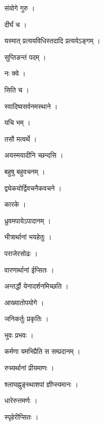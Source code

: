 \documentclass[10pt, openany]{book}
\begin{document}
\noindent संयोगे गुरु ।

\noindent दीर्घं च ।

\noindent यस्मात् प्रत्ययविधिस्तदादि प्रत्ययेऽङ्गम् ।

\noindent सुप्तिङन्तं पदम् ।

\noindent नः क्ये ।

\noindent सिति च ।

\noindent स्वादिष्वसर्वनमस्थाने ।

\noindent यचि भम् ।

\noindent तसौ मत्वर्थे ।

\noindent अयस्मयादीनि च्छन्दसि ।

\noindent बहुषु बहुवचनम् ।

\noindent द्व्येकयोर्द्विवचनैकवचने ।

\noindent कारके ।

\noindent ध्रुवमपायेऽपादानम् ।

\noindent भीत्रार्थानां भयहेतुः ।

\noindent पराजेरसोढः ।

\noindent वारणार्थानां ईप्सितः ।

\noindent अन्तर्द्धौ येनादर्शनमिच्छति ।

\noindent आख्यातोपयोगे ।

\noindent जनिकर्तुः प्रकृतिः ।

\noindent भुवः प्रभवः ।

\noindent कर्मणा यमभिप्रैति स सम्प्रदानम् ।

\noindent रुच्यर्थानां प्रीयमाणः ।

\noindent श्लाघह्नुङ्स्थाशपां ज्ञीप्स्यमानः ।

\noindent धारेरुत्तमर्णः ।

\noindent स्पृहेरीप्सितः ।
\end{document}
